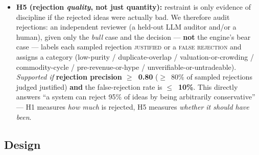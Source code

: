 \documentclass[11pt]{article}
\begin{document}
\begin{itemize}
  \item \textbf{H5 (rejection \emph{quality}, not just quantity):} restraint is only evidence of
    discipline if the rejected ideas were actually bad. We therefore audit rejections: an
    independent reviewer (a held-out LLM auditor and/or a human), given only the \emph{bull} case
    and the decision --- \textbf{not} the engine's bear case --- labels each sampled rejection
    \textsc{justified} or a \textsc{false rejection} and assigns a category (low-purity /
    duplicate-overlap / valuation-or-crowding / commodity-cycle / pre-revenue-or-hype /
    unverifiable-or-untradeable). \emph{Supported if} \textbf{rejection precision $\geq$~0.80}
    ($\geq$~80\% of sampled rejections judged justified) \textbf{and} the false-rejection rate is
    \textbf{$\leq$~10\%}. This directly answers ``a system can reject 95\% of ideas by being
    arbitrarily conservative'' --- H1 measures \emph{how much} is rejected, H5 measures
    \emph{whether it should have been}.
\end{itemize}

\subsection*{Design}
\end{document}
